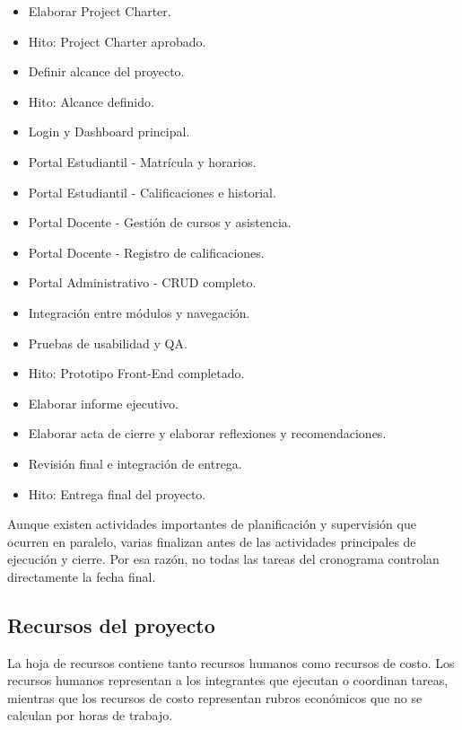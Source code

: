 \documentclass[11pt,spanish]{article}
\begin{document}
\begin{itemize}[leftmargin=*, label={\textbullet}]
    \item Elaborar Project Charter.
    \item Hito: Project Charter aprobado.
    \item Definir alcance del proyecto.
    \item Hito: Alcance definido.
    \item Login y Dashboard principal.
    \item Portal Estudiantil - Matrícula y horarios.
    \item Portal Estudiantil - Calificaciones e historial.
    \item Portal Docente - Gestión de cursos y asistencia.
    \item Portal Docente - Registro de calificaciones.
    \item Portal Administrativo - CRUD completo.
    \item Integración entre módulos y navegación.
    \item Pruebas de usabilidad y QA.
    \item Hito: Prototipo Front-End completado.
    \item Elaborar informe ejecutivo.
    \item Elaborar acta de cierre y elaborar reflexiones y recomendaciones.
    \item Revisión final e integración de entrega.
    \item Hito: Entrega final del proyecto.
\end{itemize}

Aunque existen actividades importantes de planificación y supervisión que ocurren en paralelo, varias finalizan antes de las actividades principales de ejecución y cierre. Por esa razón, no todas las tareas del cronograma controlan directamente la fecha final.

\subsection{Recursos del proyecto}

La hoja de recursos contiene tanto recursos humanos como recursos de costo. Los recursos humanos representan a los integrantes que ejecutan o coordinan tareas, mientras que los recursos de costo representan rubros económicos que no se calculan por horas de trabajo.
\end{document}
